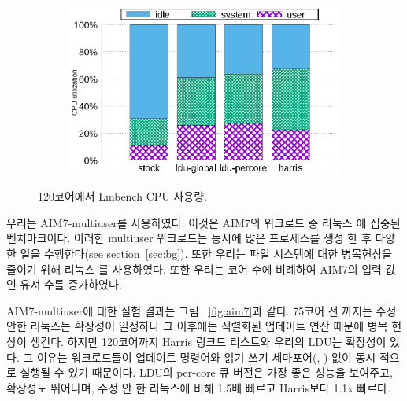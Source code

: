 \begin{figure}[tb]
    \centering
    \begin{subfigure}[b]{1\textwidth}
  \begin{center}
        \includegraphics[scale=0.7]{graph/lmbench_cpuutils.eps}
  \end{center}
    \end{subfigure}
        \centering
    \caption{120코어에서 Lmbench CPU 사용량.}
    \label{fig:utilization_lmbench}
    
\end{figure}



우리는 AIM7-multiuser를 사용하였다. 
이것은 AIM7의 워크로드 중 리눅스 에 집중된 벤치마크이다. 
이러한 multiuser 워크로드는 동시에 많은 프로세스를 생성 한 후 다양한 
일을 수행한다(see section~\ref{sec:bg}). 
또한 우리는 파일 시스템에 대한 병목현상을 줄이기 위해 리눅스 를 사용하였다. 
또한 우리는 코어 수에 비례하여 AIM7의 입력 값인 유져 수를 증가하였다. 
 
AIM7-multiuser에 대한 실험 결과는 그림 ~\ref{fig:aim7}과 같다.
75코어 전 까지는 수정 안한 리눅스는 확장성이 일정하나 그 이후에는 직렬화된 업데이트 
연산 때문에 병목 현상이 생긴다. 
하지만 120코어까지 Harris 링크드 리스트와 우리의 LDU는 확장성이 있다. 
그 이유는 워크로드들이 업데이트 명령어와 읽기-쓰기 세마포어(,
) 없이 동시 적으로 실행될 수 있기 때문이다.
LDU의 per-core 큐 버전은 가장 좋은 성능을 보여주고, 확장성도 뛰어나며, 
수정 안 한 리눅스에 비해 1.5배 빠르고 Harris보다 1.1x 빠르다.

